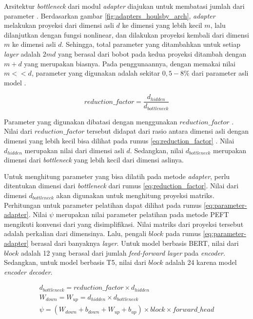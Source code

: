Arsitektur \textit{bottleneck} dari modul \textit{adapter} diajukan untuk membatasi jumlah dari parameter \parencite{adapter_houlsby}. Berdasarkan gambar \ref{fig:adapters_houlsby_arch}, \textit{adapter} melakukan proyeksi dari dimensi asli $d$ ke dimensi yang lebih kecil $m$, lalu dilanjutkan dengan fungsi nonlinear, dan dilakukan proyeksi kembali dari dimensi $m$ ke dimensi asli $d$. Sehingga, total parameter yang ditambahkan untuk setiap \textit{layer} adalah $2md$ yang berasal dari bobot pada kedua proyeksi ditambah dengan $m+d$ yang merupakan biasnya. Pada penggunaannya, dengan memakai nilai $m << d$, parameter yang digunakan adalah sekitar $0,5-8\%$ dari parameter asli model \parencite{adapter_houlsby}.

\begin{equation}
    reduction\_factor = \frac{d_{hidden}}{d_{bottleneck}}
    \label{eq:reduction_factor}
\end{equation}

Parameter yang digunakan dibatasi dengan menggunakan $reduction\_factor$ \parencite{adapterhub}. Nilai dari $reduction\_factor$ tersebut didapat dari rasio antara dimensi asli dengan dimensi yang lebih kecil bisa dilihat pada rumus \ref{eq:reduction_factor} \parencite{adapterhub}. Nilai $d_{hidden}$ merupakan nilai dari dimensi asli $d$. Sedangkan, nilai $d_{bottleneck}$ merupakan dimensi dari \textit{bottleneck} yang lebih kecil dari dimensi aslinya.

Untuk menghitung parameter yang bisa dilatih pada metode \textit{adapter}, perlu ditentukan dimensi dari \textit{bottleneck} dari rumus \ref{eq:reduction_factor}. Nilai dari dimensi $d_{bottleneck}$ akan digunakan untuk menghitung proyeksi matriks. Perhitungan untuk parameter pelatihan dapat dilihat pada rumus \ref{eq:parameter-adapter}. Nilai $\psi$ merupakan nilai parameter pelatihan pada metode PEFT mengikuti konvensi dari \citeauthor{adapter_houlsby} yang disimplifikasi. Nilai matriks dari proyeksi tersebut adalah perkalian dari dimensinya. Lalu, pengali $block$ pada rumus \ref{eq:parameter-adapter} berasal dari banyaknya \textit{layer}. Untuk model berbasis BERT, nilai dari $block$ adalah 12 yang berasal dari jumlah \textit{feed-forward layer} pada \textit{encoder}. Sedangkan, untuk model berbasis T5, nilai dari $block$ adalah 24 karena model \textit{encoder decoder}.

\begin{equation}
    \begin{aligned}
        d_{bottleneck} = reduction\_factor \times {d_{hidden}} \\
        W_{down} = W_{up} = d_{hidden} \times d_{bottleneck} \\
        \psi = (W_{down} + b_{down} + W_{up} + b_{up}) \times block \times forward\_head
    \end{aligned}
    \label{eq:parameter-adapter}
\end{equation}


